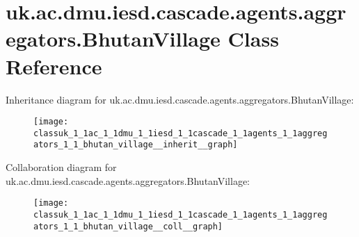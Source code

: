 \hypertarget{classuk_1_1ac_1_1dmu_1_1iesd_1_1cascade_1_1agents_1_1aggregators_1_1_bhutan_village}{\section{uk.\-ac.\-dmu.\-iesd.\-cascade.\-agents.\-aggregators.\-Bhutan\-Village Class Reference}
\label{classuk_1_1ac_1_1dmu_1_1iesd_1_1cascade_1_1agents_1_1aggregators_1_1_bhutan_village}
}


Inheritance diagram for uk.\-ac.\-dmu.\-iesd.\-cascade.\-agents.\-aggregators.\-Bhutan\-Village\-:\nopagebreak
\begin{figure}[H]
\begin{center}
\leavevmode
\texttt{[image: classuk\_1\_1ac\_1\_1dmu\_1\_1iesd\_1\_1cascade\_1\_1agents\_1\_1aggregators\_1\_1\_bhutan\_village\_\_inherit\_\_graph]}
\end{center}
\end{figure}


Collaboration diagram for uk.\-ac.\-dmu.\-iesd.\-cascade.\-agents.\-aggregators.\-Bhutan\-Village\-:\nopagebreak
\begin{figure}[H]
\begin{center}
\leavevmode
\texttt{[image: classuk\_1\_1ac\_1\_1dmu\_1\_1iesd\_1\_1cascade\_1\_1agents\_1\_1aggregators\_1\_1\_bhutan\_village\_\_coll\_\_graph]}
\end{center}
\end{figure}
